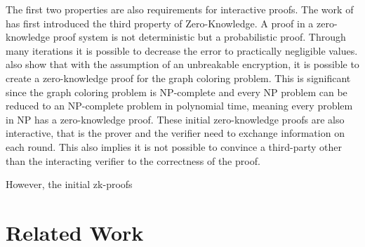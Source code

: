 The first two properties are also requirements for interactive proofs. The work of \cite{Goldwasser.1985} has first introduced the third property of Zero-Knowledge. A proof in a zero-knowledge proof system is not deterministic but a probabilistic proof. Through many iterations it is possible to decrease the error to practically negligible values. \cite{Goldreich.1991} also show that with the assumption of an unbreakable encryption, it is possible to create a zero-knowledge proof for the graph coloring problem. This is significant since the graph coloring problem is NP-complete and every NP problem can be reduced to an NP-complete problem in polynomial time, meaning every problem in NP has a zero-knowledge proof. These initial zero-knowledge proofs are also interactive, that is the prover and the verifier need to exchange information on each round. This also implies it is not possible to convince a third-party other than the interacting verifier to the correctness of the proof. 


However, the initial zk-proofs 
\section{Related Work}